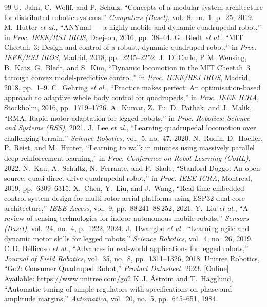 \documentclass[journal]{IEEEtran}
\begin{document}
\begin{thebibliography}{99}
U.~Jahn, C.~Wolff, and P.~Schulz,
``Concepts of a modular system architecture for distributed
robotic systems,''
\textit{Computers (Basel)}, vol.~8, no.~1, p.~25, 2019.
M.~Hutter \textit{et al.},
``ANYmal --- a highly mobile and dynamic quadrupedal robot,''
in \textit{Proc. IEEE/RSJ IROS}, Daejeon, 2016, pp.~38--44.
G.~Bledt \textit{et al.},
``MIT Cheetah~3: Design and control of a robust, dynamic
quadruped robot,''
in \textit{Proc. IEEE/RSJ IROS}, Madrid, 2018, pp.~2245--2252.
J.~Di Carlo, P.\,M. Wensing, B.~Katz, G.~Bledt, and S.~Kim,
``Dynamic locomotion in the MIT Cheetah~3 through convex
model-predictive control,''
in \textit{Proc. IEEE/RSJ IROS}, Madrid, 2018, pp.~1--9.
C.~Gehring \textit{et al.},
``Practice makes perfect: An optimisation-based approach to
adaptive whole body control for quadrupeds,''
in \textit{Proc. IEEE ICRA}, Stockholm, 2016, pp.~1719--1726.
A.~Kumar, Z.~Fu, D.~Pathak, and J.~Malik,
``RMA: Rapid motor adaptation for legged robots,''
in \textit{Proc. Robotics: Science and Systems (RSS)}, 2021.
J.~Lee \textit{et al.},
``Learning quadrupedal locomotion over challenging terrain,''
\textit{Science Robotics},
vol.~5, no.~47, 2020.
N.~Rudin, D.~Hoeller, P.~Reist, and M.~Hutter,
``Learning to walk in minutes using massively parallel deep
reinforcement learning,''
in \textit{Proc. Conference on Robot Learning (CoRL)}, 2022.
N.~Kau, A.~Schultz, N.~Ferrante, and P.~Slade,
``Stanford Doggo: An open-source, quasi-direct-drive
quadrupedal robot,''
in \textit{Proc. IEEE ICRA}, Montreal, 2019, pp.~6309--6315.
X.~Chen, Y.~Liu, and J.~Wang,
``Real-time embedded control system design for multi-rotor
aerial platforms using ESP32 dual-core architecture,''
\textit{IEEE Access}, vol.~9, pp.~88\,241--88\,252, 2021.
Y.~Liu \textit{et al.},
``A review of sensing technologies for indoor autonomous
mobile robots,''
\textit{Sensors (Basel)}, vol.~24, no.~4, p.~1222, 2024.
J.~Hwangbo \textit{et al.},
``Learning agile and dynamic motor skills for legged robots,''
\textit{Science Robotics}, vol.~4, no.~26, 2019.
C.\,D. Bellicoso \textit{et al.},
``Advances in real-world applications for legged robots,''
\textit{Journal of Field Robotics},
vol.~35, no.~8, pp.~1311--1326, 2018.
Unitree Robotics,
``Go2: Consumer Quadruped Robot,''
\textit{Product Datasheet}, 2023.
[Online]. Available: \url{https://www.unitree.com/go2}
K.\,J. \r{A}str\"{o}m and T.~H\"{a}gglund,
``Automatic tuning of simple regulators with specifications on
phase and amplitude margins,''
\textit{Automatica}, vol.~20, no.~5, pp.~645--651, 1984.
\end{thebibliography}
\end{document}
